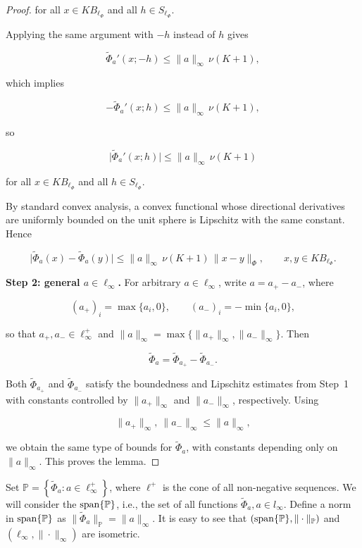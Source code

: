 \documentclass[12pt]{article}
\theoremstyle{thmstyleone}%
\theoremstyle{thmstyletwo}%
\theoremstyle{thmstylethree}%
\begin{document}
{{\begin{proof}
for all $x\in K B_{\ell_\Phi}$ and all $h\in S_{\ell_\Phi}$.

Applying the same argument with $-h$ instead of $h$ gives


\[
  \widetilde{\Phi}_a'(x;-h)
  \le \|a\|_\infty \,\nu(K+1),
\]


which implies


\[
  -\widetilde{\Phi}_a'(x;h)
  \le \|a\|_\infty \,\nu(K+1),
\]


so


\[
  \bigl|\widetilde{\Phi}_a'(x;h)\bigr|
  \le \|a\|_\infty \,\nu(K+1)
\]


for all $x\in K B_{\ell_\Phi}$ and all $h\in S_{\ell_\Phi}$.

By standard convex analysis, a convex functional whose directional derivatives are uniformly bounded on the unit sphere is Lipschitz with the same constant. Hence


\[
  \bigl|\widetilde{\Phi}_a(x)-\widetilde{\Phi}_a(y)\bigr|
  \le \|a\|_\infty \,\nu(K+1)\,\|x-y\|_\Phi,
  \qquad x,y\in K B_{\ell_\Phi}.
\]



\medskip
\noindent\textbf{Step 2: general $a\in\ell_\infty$.}
For arbitrary $a\in\ell_\infty$, write $a=a_+ - a_-$, where


\[
  (a_+)_i = \max\{a_i,0\},\qquad (a_-)_i = -\min\{a_i,0\},
\]


so that $a_+,a_-\in\ell_\infty^+$ and $\|a\|_\infty = \max\{\|a_+\|_\infty,\|a_-\|_\infty\}$.  
Then


\[
  \widetilde{\Phi}_a = \widetilde{\Phi}_{a_+} - \widetilde{\Phi}_{a_-}.
\]


Both $\widetilde{\Phi}_{a_+}$ and $\widetilde{\Phi}_{a_-}$ satisfy the boundedness and Lipschitz estimates from Step~1 with constants controlled by $\|a_+\|_\infty$ and $\|a_-\|_\infty$, respectively. Using


\[
  \|a_+\|_\infty,\ \|a_-\|_\infty \le \|a\|_\infty,
\]


we obtain the same type of bounds for $\widetilde{\Phi}_a$, with constants depending only on $\|a\|_\infty$. This proves the lemma.
\end{proof}


Set $\mathbb{P}=\left\{\widetilde{\Phi}_a:a\in \ell_\infty^{+}\right\}$,
where $\ell^+$ is the cone of all non-negative sequences.   We will consider the ${\rm span}\{\mathbb{P}\}$,
i.e., the set of all functions $\widetilde{\Phi}_a, a\in l_\infty$. Define a norm in ${\rm span}\{\mathbb{P}\}$ as $\| \widetilde{\Phi}_a\|_{\mathbb{P}}=\|a\|_\infty$. 
It is easy to see that $({\rm span}\{\mathbb{P}\},\|\cdot\|_{\mathbb{P}})$ and $(\ell_\infty,\|\cdot\|_\infty)$ are isometric.

}}
\end{document}
